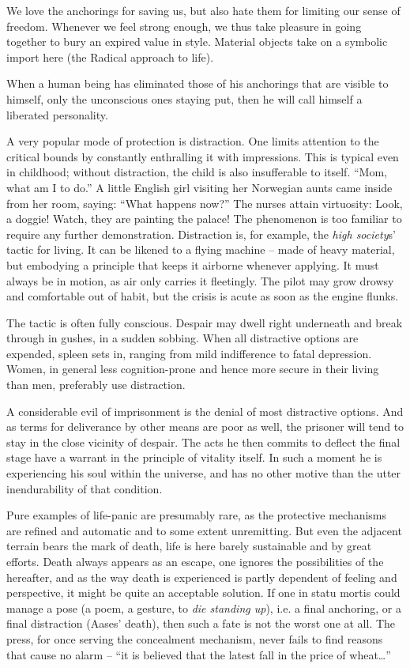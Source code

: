 \documentclass[draft,a4paper,10pt,twocolumn]{article}
\begin{document}
We love the anchorings for saving us, but also hate them for limiting our sense of freedom. Whenever we feel strong enough, we thus take pleasure in going together to bury an expired value in style. Material objects take on a symbolic import here (the Radical approach to life).

When a human being has eliminated those of his anchorings that are visible to himself, only the unconscious ones staying put, then he will call himself a liberated personality.

A very popular mode of protection is distraction. One limits attention to the critical bounds by constantly enthralling it with impressions. This is typical even in childhood; without distraction, the child is also insufferable to itself. \enquote{Mom, what am I to do.} A little English girl visiting her Norwegian aunts came inside from her room, saying: \enquote{What happens now?} The nurses attain virtuosity: Look, a doggie! Watch, they are painting the palace! The phenomenon is too familiar to require any further demonstration. Distraction is, for example, the \emph{high society}s' tactic for living. It can be likened to a flying machine -- made of heavy material, but embodying a principle that keeps it airborne whenever applying. It must always be in motion, as air only carries it fleetingly. The pilot may grow drowsy and comfortable out of habit, but the crisis is acute as soon as the engine flunks.

The tactic is often fully conscious. Despair may dwell right underneath and break through in gushes, in a sudden sobbing. When all distractive options are expended, spleen sets in, ranging from mild indifference to fatal depression. Women, in general less cognition-prone and hence more secure in their living than men, preferably use distraction.

A considerable evil of imprisonment is the denial of most distractive options. And as terms for deliverance by other means are poor as well, the prisoner will tend to stay in the close vicinity of despair. The acts he then commits to deflect the final stage have a warrant in the principle of vitality itself. In such a moment he is experiencing his soul within the universe, and has no other motive than the utter inendurability of that condition.

Pure examples of life-panic are presumably rare, as the protective mechanisms are refined and automatic and to some extent unremitting. But even the adjacent terrain bears the mark of death, life is here barely sustainable and by great efforts. Death always appears as an escape, one ignores the possibilities of the hereafter, and as the way death is experienced is partly dependent of feeling and perspective, it might be quite an acceptable solution. If one in statu mortis could manage a pose (a poem, a gesture, to \emph{die standing up}), i.e. a final anchoring, or a final distraction (Aases' death), then such a fate is not the worst one at all. The press, for once serving the concealment mechanism, never fails to find reasons that cause no alarm -- \enquote{it is believed that the latest fall in the price of wheat…}
\end{document}
